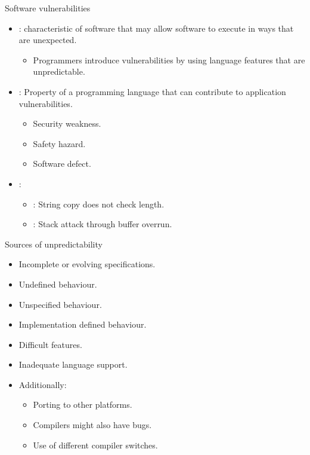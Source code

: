 \begin{frame}[t]{Software vulnerabilities}
\begin{itemize}
  \item {}:  characteristic of software
        that may allow software to execute in ways that are unexpected.

    \begin{itemize}
      \item Programmers introduce vulnerabilities by using language features that are
            unpredictable.
    \end{itemize}

  \vfill\pause
  \item {}: Property of a programming language that can
        contribute to application vulnerabilities.
    \begin{itemize}
      \item Security weakness.
      \item Safety hazard.
      \item Software defect.
    \end{itemize}

  \vfill\pause
  \item {}:
    \begin{itemize}
      \item {}: String copy does not check length.
      \item {}: Stack attack through buffer overrun.
    \end{itemize}
\end{itemize}
\end{frame}

\begin{frame}[t]{Sources of unpredictability}
\begin{itemize}
  \item Incomplete or evolving specifications.
  \item Undefined behaviour.
  \item Unspecified behaviour.
  \item Implementation defined behaviour.
  \item Difficult features.
  \item Inadequate language support.

  \vfill\pause
  \item Additionally:
    \begin{itemize}
      \item Porting to other platforms.
      \item Compilers might also have bugs.
      \item Use of different compiler switches.
    \end{itemize}
\end{itemize}
\end{frame}

